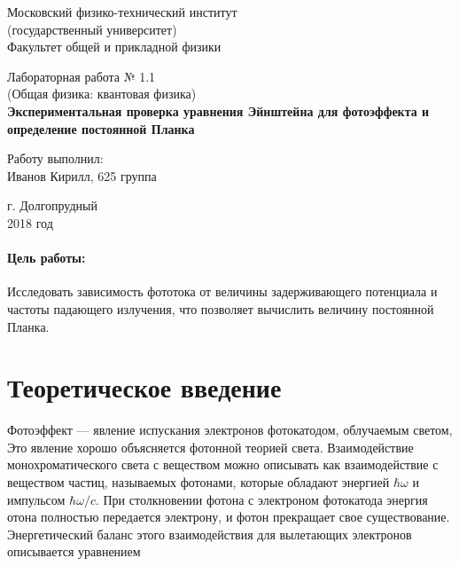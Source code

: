 \documentclass[12pt]{kiarticle}
\begin{document}
	
	\begin{titlepage}
		\begin{center}
			\large 	Московский физико-технический институт \\
			(государственный университет) \\
			Факультет общей и прикладной физики \\
			\vspace{0.2cm}
			
			\vspace{4.5cm}
			Лабораторная работа № 1.1  \\ \vspace{0.2cm}
			\large (Общая физика: квантовая физика) \\ \vspace{0.2cm}
			\LARGE \textbf{ Экспериментальная проверка уравнения Эйнштейна
				для фотоэффекта и определение постоянной Планка }
		\end{center}
		\vspace{2.3cm} \large
		
		\begin{center}
			Работу выполнил: \\
			Иванов Кирилл,
			625 группа
			\vspace{10mm}		
			
		\end{center}
		
		\begin{center} \vspace{60mm}
			г. Долгопрудный \\
			2018 год
		\end{center}
	\end{titlepage}


	\paragraph*{Цель работы:} 
	Исследовать зависимость фототока от величины задерживающего потенциала и частоты падающего излучения, что позволяет вычислить величину постоянной Планка.
	
	\section{Теоретическое введение}
	
	Фотоэффект --- явление испускания электронов фотокатодом, облучаемым светом,  Это явление хорошо объясняется фотонной теорией света. Взаимодействие монохроматического света с веществом можно описывать
	как взаимодействие с веществом частиц, называемых фотонами, которые обладают энергией $ \hbar \omega $ и импульсом $ \hbar\omega/c $. При столкновении фотона с электроном фотокатода энергия отона полностью передается электрону, и фотон прекращает свое существование. Энергетический баланс этого взаимодействия для вылетающих электронов
	описывается уравнением
	
\end{document}
